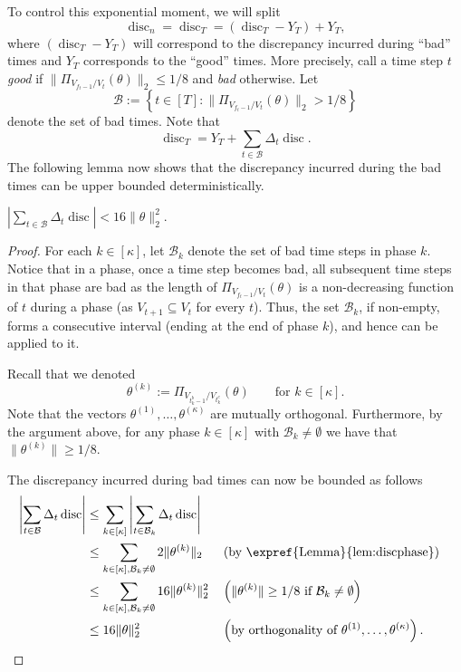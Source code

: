 \documentclass{toc}
\DeclareMathOperator{\disc}{disc}   %
\newcommand{\set}[1]{\left\{ #1 \right\}}
\begin{document}
To control this exponential moment, we will split
\[
  \disc_n=\disc_T = (\disc_T-Y_T) +
  Y_T,
\]
where $(\disc_T-Y_T)$ will correspond to the discrepancy incurred
during ``bad'' times and $Y_T$ corresponds to the ``good'' times. More
precisely, call a time step $t$ \textit{good} if
$\| \Pi_{V_{f_t-1}/V_{t}} (\theta) \|_2 \le 1/8$ and \textit{bad}
otherwise. Let
\[
\mathcal{B} := \set{t \in [T]: \|\Pi_{V_{f_t-1}/V_t}(\theta)\|_2 > 1/8}
\]
denote the set of bad times. Note that
\[
\disc_T = Y_T+ \sum_{t \in \mathcal{B}} \Delta_t \disc.
\]
The following lemma now shows that the discrepancy incurred during the bad times
can be upper bounded deterministically.

\begin{lemma} $
\left|\sum_{t \in \mathcal{B}} \Delta_t \disc\right| < 16 \|\theta\|_2^2.
$
\label{lem:l1}
\end{lemma}
\begin{proof}
For each $k \in [\kappa]$, let $\mathcal{B}_k$ denote the set of bad time steps in phase $k$. Notice that in a phase, once a time step becomes bad, all subsequent time steps in that phase are bad as the length of
$\Pi_{V_{f_t-1}/V_{t}} (\theta)$ is a non-decreasing function of $t$ during a
phase (as $V_{t+1} \subseteq V_{t}$ for every $t$).  Thus, the set $\mathcal{B}_k$, if non-empty, forms a consecutive interval (ending at the end of phase $k$), and hence
 can be applied to it.

Recall that we denoted
\[
\theta^{(k)}:=\Pi_{V_{t^b_k-1}/V_{t^e_k}} (\theta)\qquad\text{for $k \in [\kappa]$}.
\]
Note that the vectors $\theta^{(1)},\dots,\theta^{(\kappa)}$ are
mutually orthogonal. Furthermore, by the argument above, for any phase
%
$k \in [\kappa]$ with $\mathcal{B}_k\neq \emptyset$ we have that
$\|\theta^{(k)}\| \geq 1/8$.

The discrepancy incurred during bad times can now be bounded as follows
\begin{align*}
\left|\sum_{t \in \mathcal{B}} \Delta_t \disc\right|
&\leq \sum_{k \in [\kappa]} \left|\sum_{t \in \mathcal{B}_k} \Delta_t \disc\right| \\
&\leq \sum_{k \in [\kappa], \mathcal{B}_k\neq \emptyset} 2 \|\theta^{(k)}\|_2
&& \left(\text{by \expref{Lemma}{lem:discphase}} \right) \\
& \leq  \sum_{k \in  [\kappa], \mathcal{B}_k\neq \emptyset} 16 \|\theta^{(k)}\|^2_2 && \left(\|\theta^{(k)}\| \geq 1/8 \text{ if } \mathcal{B}_k\neq \emptyset  \right) \\
&\leq 16 \|\theta\|^2_2 && \left(\text{by orthogonality
of } \theta^{(1)},\dots,\theta^{(\kappa)} \right). \qedhere
\end{align*}
\end{proof}
\end{document}
